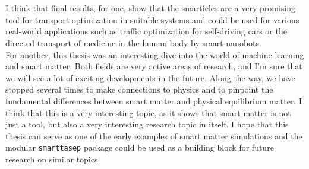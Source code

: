 \\
\\
I think that final results, for one, show that the smarticles are a very promising tool for transport optimization in suitable systems and could be used for various real-world applications such as traffic optimization for self-driving cars or the directed transport of medicine in the human body by smart nanobots. 
\\
For another, this thesis was an interesting dive into the world of machine learning and smart matter. Both fields are very active areas of research, and I'm sure that we will see a lot of exciting developments in the future. Along the way, we have stopped several times to make connections to physics and to pinpoint the fundamental differences between smart matter and physical equilibrium matter. I think that this is a very interesting topic, as it shows that smart matter is not just a tool, but also a very interesting research topic in itself. I hope that this thesis can serve as one of the early examples of smart matter simulations and the modular \texttt{smarttasep} package could be used as a building block for future research on similar topics. 
